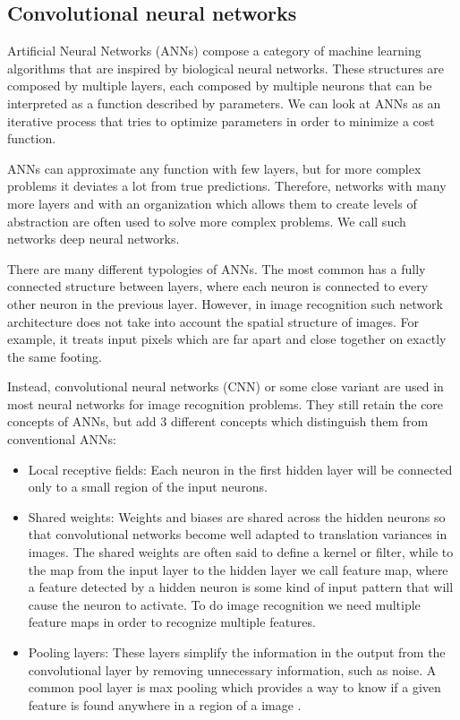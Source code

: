 \documentclass[journal,compsoc]{IEEEtran}
\begin{document}
\subsection{Convolutional neural networks}
Artificial Neural Networks (ANNs) compose a category of machine learning algorithms that are inspired by biological neural networks. These structures are composed by multiple layers, each composed by multiple neurons that can be interpreted as a function described by parameters. We can look at ANNs as an iterative process that tries to optimize parameters in order to minimize a cost function. \par
ANNs can approximate any function with few layers, but for more complex problems it deviates a lot from true predictions. Therefore, networks with many more layers and with an organization which allows them to create levels of abstraction are often used to solve more complex problems. We call such networks deep neural networks. \par
There are many different typologies of ANNs. The most common has a fully connected structure between layers, where each neuron is connected to every other neuron in the previous layer. However, in image recognition such network architecture does not take into account the spatial structure of images. For example, it treats input pixels which are far apart and close together on exactly the same footing. \par
Instead, convolutional neural networks (CNN) or some close variant are used in most neural networks for image recognition problems\cite{Nielsen2017a}. They still retain the core concepts of ANNs, but add 3 different concepts which distinguish them from conventional ANNs:
\begin{itemize}
\item Local receptive fields: Each neuron in the first hidden layer will be connected only to a small region of the input neurons.
\item Shared weights: Weights and biases are shared across the hidden neurons so that convolutional networks become well adapted to translation variances in images. The shared weights are often said to define a kernel or filter, while to the map from the input layer to the hidden layer we call feature map, where a feature detected by a hidden neuron is some kind of input pattern that will cause the neuron to activate. To do image recognition we need multiple feature maps in order to recognize multiple features.
\item Pooling layers: These layers simplify the information in the output from the convolutional layer by removing unnecessary information, such as noise. A common pool layer is max pooling which provides a way to know if a given feature is found anywhere in a region of a image \cite{Nielsen2017a}.
\end{itemize}
\end{document}
